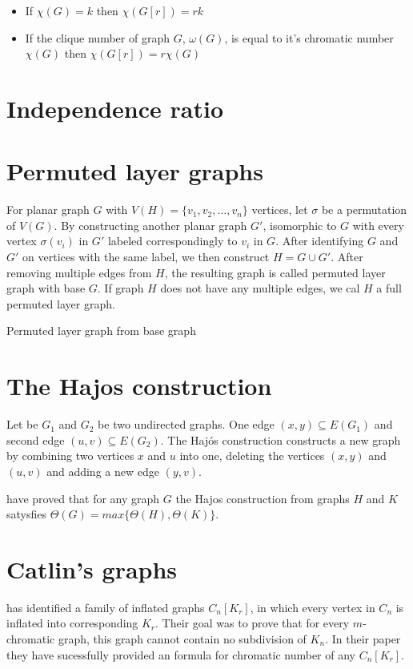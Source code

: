 \begin{itemize}
    \item If $\chi(G) = k$  then $\chi(G[r]) = rk$
    \item If the clique number of graph $G$, $\omega(G)$, is equal to it's chromatic number $\chi(G)$ then $\chi(G[r]) = r\chi(G)$
\end{itemize}

\section{Independence ratio}
\section{Permuted layer graphs}

For planar graph $G$ with $V(H)=\{v_1,v_2,\dots,v_n\}$ vertices, let $\sigma$ be a permutation of $V(G)$. By constructing another planar graph $G'$, isomorphic to $G$ with every vertex $\sigma(v_i)$ in $G'$ labeled correspondingly to $v_i$ in $G$. After identifying $G$ and $G'$ on vertices with the same label, we then construct $H = G \cup G'$. After removing multiple edges from $H$, the resulting graph is called permuted layer graph with base $G$. If graph $H$ does not have any multiple edges, we cal $H$ a full permuted layer graph.

Permuted layer graph from base graph
\parencite{boutin2008thickness}

\section{The Hajos construction}

Let be $G_1$ and $G_2$ be two undirected graphs. One edge $(x,y) \subseteq E(G_1)$ and second edge $(u,v) \subseteq E(G_2)$. The Hajós construction constructs a new graph by combining two vertices $x$ and $u$ into one, deleting the vertices $(x,y)$ and $(u,v)$ and adding a new edge $(y,v)$.

\textcite{boutin2008thickness} have proved that for any graph $G$ the Hajos construction from graphs $H$ and $K$ satysfies $\Theta(G) = max\{\Theta(H), \Theta(K)\}$.

\section{Catlin’s graphs}

\textcite{CATLIN1979268graphs} has identified a family of inflated graphs $C_n[K_r]$, in which every vertex in $C_n$ is inflated into corresponding $K_r$. Their goal was to prove that for every $m$-chromatic graph, this graph cannot contain no subdivision of $K_n$. In their paper they have sucessfully provided an formula for chromatic number of any $C_n[K_r]$.

